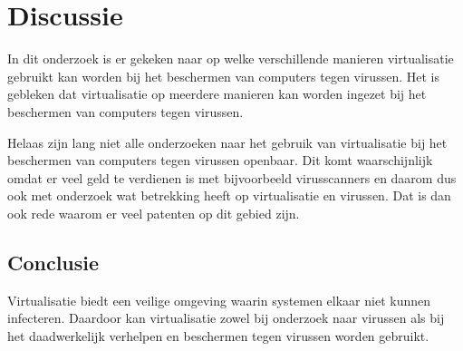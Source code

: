 \documentclass[12pt]{uva-inf-article}
\begin{document}
\section{Discussie}
In dit onderzoek is er gekeken naar op welke verschillende manieren virtualisatie
gebruikt kan worden bij het beschermen van computers tegen virussen. Het is
gebleken dat virtualisatie op meerdere manieren kan worden ingezet bij het
beschermen van computers tegen virussen.

Helaas zijn lang niet alle onderzoeken naar het gebruik van virtualisatie
bij het beschermen van computers tegen virussen openbaar. Dit komt waarschijnlijk omdat
er veel geld te verdienen is met bijvoorbeeld virusscanners en daarom dus ook
met onderzoek wat betrekking heeft op virtualisatie en virussen. Dat is dan ook
rede waarom er veel patenten op dit gebied zijn.

\subsection{Conclusie}
Virtualisatie biedt een veilige omgeving waarin systemen elkaar niet kunnen
infecteren. Daardoor kan virtualisatie zowel bij onderzoek naar virussen als bij
het daadwerkelijk verhelpen en beschermen tegen virussen worden gebruikt.




\end{document}
